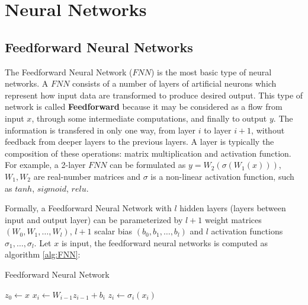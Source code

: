 \section{Neural Networks}
\subsection{Feedforward Neural Networks}
The Feedforward Neural Network ($\displaystyle FNN$) is the most basic type of neural networks. A $\displaystyle FNN$ consists of a number of layers of artificial neurons which represent how input data are transformed to produce desired output. This type of network is called \textbf{Feedforward} because it may be considered as a flow from input $\displaystyle x$, through some intermediate computations, and finally to output $\displaystyle y$. The information is transfered in only one way, from layer $\displaystyle i$ to layer $\displaystyle i + 1$, without feedback from deeper layers to the previous layers. A layer is typically the composition of these operations: matrix multiplication and activation function. For example, a 2-layer $\displaystyle FNN$ can be formulated as $\displaystyle y = W_2(\sigma(W_1(x)))$, $\displaystyle W_1, W_2$ are real-number matrices and $\displaystyle \sigma$ is a non-linear activation function, such as $\displaystyle tanh$, $\displaystyle sigmoid$, $\displaystyle relu$.

Formally, a Feedforward Neural Network with $\displaystyle l$ hidden layers (layers between input and output layer) can be parameterized by $\displaystyle l + 1$ weight matrices $\displaystyle (W_0, W_1, \dots, W_l)$, $\displaystyle l + 1$ scalar bias $\displaystyle (b_0, b_1, \dots, b_l)$ and $\displaystyle l$ activation functions $\displaystyle \sigma_1, \dots, \sigma_l$. Let $\displaystyle x$ is input, the feedforward neural networks is computed as algorithm \ref{alg:FNN}:
\begin{algorithm}
    \caption{Feedforward Neural Network} \label{alg:FNN}
    \begin{algorithmic}[1]
        \State $z_0 \gets x$
            \State $x_i \gets W_{i - 1}z_{i - 1} + b_i$
            \State $z_i \gets \sigma_i(x_i)$
        \EndFor
    \end{algorithmic}
\end{algorithm}

